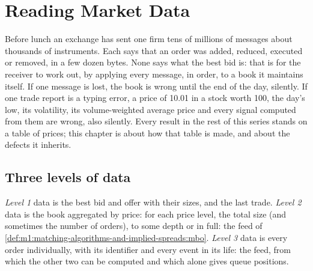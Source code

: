 \chapter{Reading Market Data}\label{ch:m1:reading-market-data}

Before lunch an exchange has sent one firm tens of millions of messages about
thousands of instruments. Each says that an order was added, reduced,
executed or removed, in a few dozen bytes. None says what the best bid is:
that is for the receiver to work out, by applying every message, in order, to
a book it maintains itself. If one message is lost, the book is wrong until
the end of the day, silently. If one trade report is a typing error, a price
of 10.01 in a stock worth 100, the day's low, its volatility, its
volume-weighted average price and every signal computed from them are wrong,
also silently. Every result in the rest of this series stands on a table of
prices; this chapter is about how that table is made, and about the defects
it inherits.

\section{Three levels of data}

\begin{definition}\label{def:m1:reading-market-data:levels}
\emph{Level 1} data is the best bid and offer with their
sizes, and the last trade. \emph{Level 2} data is the book
aggregated by price: for each price level, the total size (and sometimes
the number of orders), to some depth or in full: the  feed of
\cref{def:m1:matching-algorithms-and-implied-spreads:mbo}. \emph{Level
3} data is every order individually, with its identifier and
every event in its life: the  feed, from which the other two
can be computed and which alone gives queue positions.
\end{definition}

